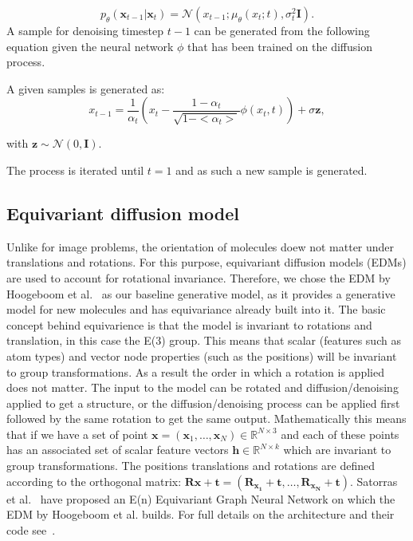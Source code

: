\documentclass[journal=jacsat,manuscript=article]{achemso}
\begin{document}
\begin{equation}
p_{\theta}(\mathbf{x}_{t-1}|\mathbf{x}_t)=\mathcal{N}(x_{t-1}; \mu_{\theta}(x_t;t), \sigma_t^2\mathbf{I}).
\end{equation}
A sample for denoising timestep $t-1$ can be generated from the following equation given the neural network $\phi$ that has been trained on the diffusion process. 

A given samples is generated as:
\begin{equation}
 x_{t-1} = \frac{1}{\alpha_t}(x_t-\frac{1-\alpha_t}{\sqrt{1-<\alpha_t>}}\phi(x_t,t)) +\sigma \mathbf{z},   
\end{equation}

with $\mathbf{z}\sim\mathcal{N}(0,\mathbf{I})$.

The process is iterated until $t=1$ and as such a new sample is generated. 

\subsection*{Equivariant diffusion model}
Unlike for image problems, the orientation of molecules doew not matter under translations and rotations. For this purpose, equivariant diffusion models (EDMs) are used to account for rotational invariance. Therefore, we chose the EDM by Hoogeboom et al.~\cite{hoogeboom2022equivariant} as our baseline generative model, as it provides a generative model for new molecules and has equivariance already built into it. The basic concept behind equivarience is that the model is invariant to rotations and translation, in this case the E(3) group. This means that scalar (features such as atom types) and vector node properties (such as the positions) will be invariant to group transformations. As a result the order in which a rotation is applied does not matter. The input to the model can be rotated and diffusion/denoising  applied to get a structure, or the diffusion/denoising process can be applied first followed by the same rotation to get the same output. 
Mathematically this means that if we have a set of point $\mathbf{x} = (\mathbf{x}_1,\ldots,\mathbf{x}_N) \in \mathbb{R}^{N\times 3}$ and each of these points has an associated set of scalar feature vectors $\mathbf{h}\in \mathbb{R}^{N\times k}$ which are invariant to group transformations. The positions translations and rotations are defined according to the orthogonal matrix: $\mathbf{Rx + t} = (\mathbf{R_{x_1}+t},\ldots, \mathbf{R_{x_N}+t})$. Satorras et al.~\cite{satorras2022equivariant} have proposed an E(n) Equivariant Graph Neural Network on which the EDM by Hoogeboom et al. builds. For full details on the architecture and their code see~\cite{hoogeboom2022equivariant}. 
\end{document}
